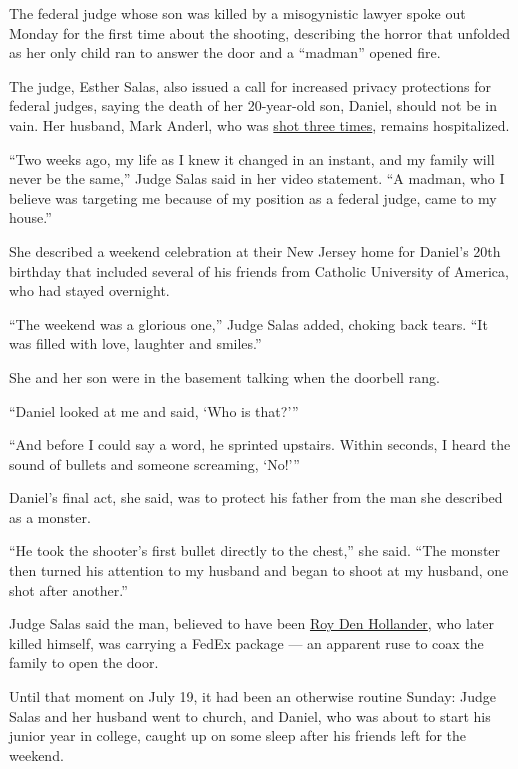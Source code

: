 The federal judge whose son was killed by a misogynistic lawyer spoke
out Monday for the first time about the shooting, describing the horror
that unfolded as her only child ran to answer the door and a ``madman''
opened fire.

The judge, Esther Salas, also issued a call for increased privacy
protections for federal judges, saying the death of her 20-year-old son,
Daniel, should not be in vain. Her husband, Mark Anderl, who was
\href{https://www.nytimes3xbfgragh.onion/2020/07/20/nyregion/esther-salas.html}{shot
three times}, remains hospitalized.

``Two weeks ago, my life as I knew it changed in an instant, and my
family will never be the same,'' Judge Salas said in her video
statement. ``A madman, who I believe was targeting me because of my
position as a federal judge, came to my house.''

She described a weekend celebration at their New Jersey home for
Daniel's 20th birthday that included several of his friends from
Catholic University of America, who had stayed overnight.

``The weekend was a glorious one,'' Judge Salas added, choking back
tears. ``It was filled with love, laughter and smiles.''

She and her son were in the basement talking when the doorbell rang.

``Daniel looked at me and said, `Who is that?'''

``And before I could say a word, he sprinted upstairs. Within seconds, I
heard the sound of bullets and someone screaming, `No!'''

Daniel's final act, she said, was to protect his father from the man she
described as a monster.

``He took the shooter's first bullet directly to the chest,'' she said.
``The monster then turned his attention to my husband and began to shoot
at my husband, one shot after another.''

Judge Salas said the man, believed to have been
\href{https://www.nytimes3xbfgragh.onion/2020/07/25/nyregion/roy-den-hollander-esther-salas-list.html}{Roy
Den Hollander}, who later killed himself, was carrying a FedEx package
--- an apparent ruse to coax the family to open the door.

Until that moment on July 19, it had been an otherwise routine Sunday:
Judge Salas and her husband went to church, and Daniel, who was about to
start his junior year in college, caught up on some sleep after his
friends left for the weekend.

